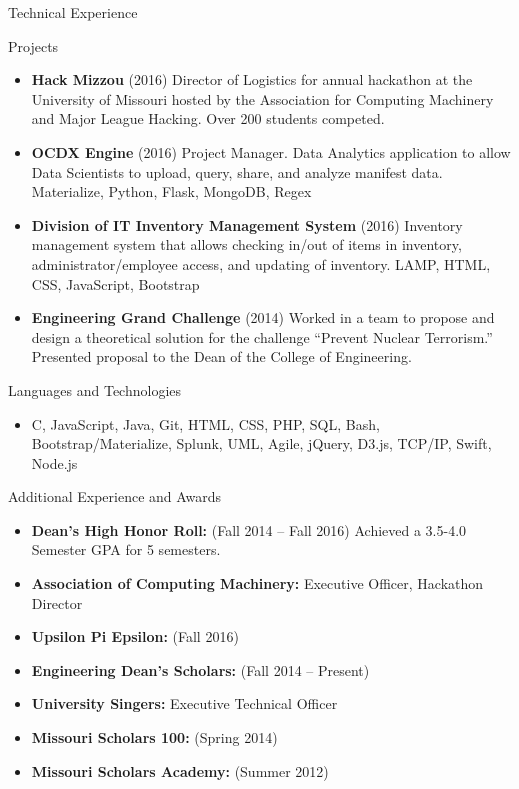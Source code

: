 \documentclass[]{mcdowellcv}
\begin{document}
	\begin{cvsection}{Technical Experience}
		\begin{cvsubsection}{Projects}{}{}
			\begin{itemize}
				\item \textbf{Hack Mizzou} (2016) Director of Logistics for annual hackathon at the University of Missouri hosted by the Association for Computing Machinery and Major League Hacking. Over 200 students competed.
				\item \textbf{OCDX Engine} (2016) Project Manager. Data Analytics application to allow Data Scientists to upload, query, share, and analyze manifest data. Materialize, Python, Flask, MongoDB, Regex
				\item \textbf{Division of IT Inventory Management System} (2016) Inventory management system that allows checking in/out of items in inventory, administrator/employee access, and updating of inventory. LAMP, HTML, CSS, JavaScript, Bootstrap
				\item \textbf{Engineering Grand Challenge} (2014) Worked in a team to propose and design a theoretical solution for the challenge “Prevent Nuclear Terrorism.” Presented proposal to the Dean of the College of Engineering.
			\end{itemize}
		\end{cvsubsection}
      \begin{cvsubsection}{Languages and Technologies}{}{}
      \begin{itemize}
				\item C, JavaScript, Java, Git, HTML, CSS, PHP, SQL,  Bash, Bootstrap/Materialize, Splunk, UML, Agile, jQuery, D3.js, TCP/IP, Swift, Node.js
			\end{itemize}
        \end{cvsubsection}
	\end{cvsection}
	
	\begin{cvsection}{Additional Experience and Awards}
		\begin{cvsubsection}{}{}{}	
			\begin{itemize}
				\item \textbf{Dean’s High Honor Roll:}  (Fall 2014 -- Fall 2016) Achieved a 3.5-4.0 Semester GPA for 5 semesters.
                \item \textbf{Association of Computing Machinery:} Executive Officer, Hackathon Director
		\item \textbf{Upsilon Pi Epsilon:}  (Fall 2016)
                \item \textbf{Engineering Dean’s Scholars:} (Fall 2014 -- Present)
                \item \textbf{University Singers:} Executive Technical Officer
                \item \textbf{Missouri Scholars 100:} (Spring 2014)
                \item \textbf{Missouri Scholars Academy:} (Summer 2012)
			\end{itemize}
		\end{cvsubsection}
	\end{cvsection}
\end{document}

